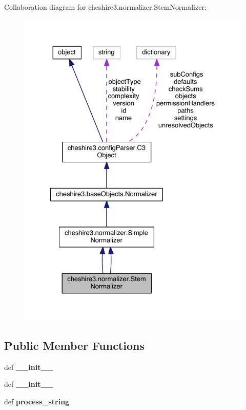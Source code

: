 Collaboration diagram for cheshire3.\-normalizer.\-Stem\-Normalizer\-:
\nopagebreak
\begin{figure}[H]
\begin{center}
\leavevmode
\includegraphics[width=328pt]{classcheshire3_1_1normalizer_1_1_stem_normalizer__coll__graph}
\end{center}
\end{figure}
\subsection*{Public Member Functions}
\begin{DoxyCompactItemize}
\item 
\hypertarget{classcheshire3_1_1normalizer_1_1_stem_normalizer_a336ac4966ce9763a69b8908c09d09804}{def {\bfseries \-\_\-\-\_\-init\-\_\-\-\_\-}}\label{classcheshire3_1_1normalizer_1_1_stem_normalizer_a336ac4966ce9763a69b8908c09d09804}

\item 
\hypertarget{classcheshire3_1_1normalizer_1_1_stem_normalizer_a336ac4966ce9763a69b8908c09d09804}{def {\bfseries \-\_\-\-\_\-init\-\_\-\-\_\-}}\label{classcheshire3_1_1normalizer_1_1_stem_normalizer_a336ac4966ce9763a69b8908c09d09804}

\item 
\hypertarget{classcheshire3_1_1normalizer_1_1_stem_normalizer_acbc77d33f4485883a2e387014dbf46bd}{def {\bfseries process\-\_\-string}}\label{classcheshire3_1_1normalizer_1_1_stem_normalizer_acbc77d33f4485883a2e387014dbf46bd}

\end{DoxyCompactItemize}

